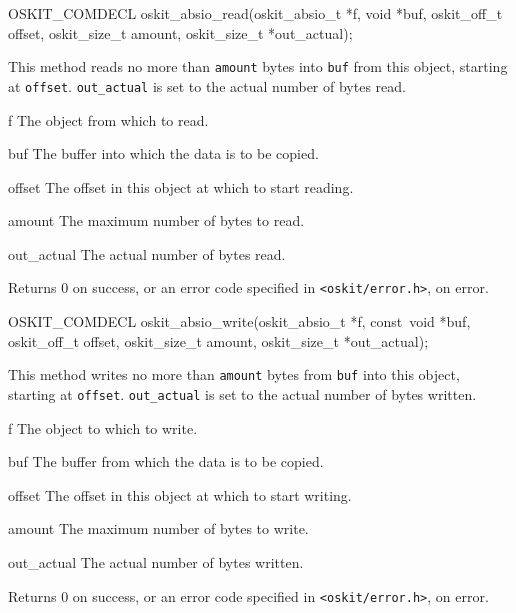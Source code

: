 \begin{apisyn}

	\funcproto OSKIT_COMDECL
	oskit_absio_read(oskit_absio_t *f, 
		         void *buf,
	                 oskit_off_t offset,
			 oskit_size_t amount,
			 \outparam oskit_size_t *out_actual);
\end{apisyn}
\begin{apidesc}
	This method reads no more than {\tt amount} bytes into
	{\tt buf} from this object, starting at {\tt offset}.
	{\tt out_actual} is set to the actual number of bytes read.
\end{apidesc}
\begin{apiparm}
	\item[f]
		The object from which to read.
	\item[buf]
		The buffer into which the data is to be copied.	
	\item[offset]
		The offset in this object at which to start reading.
	\item[amount]
		The maximum number of bytes to read.	
	\item[out_actual]
		The actual number of bytes read.
\end{apiparm}
\begin{apiret}
	Returns 0 on success, or an error code specified in
	{\tt <oskit/error.h>}, on error.
\end{apiret}


\begin{apisyn}

	\funcproto OSKIT_COMDECL
	oskit_absio_write(oskit_absio_t *f, 
		         const~void *buf,
	                 oskit_off_t offset,
			 oskit_size_t amount,
			 \outparam oskit_size_t *out_actual);
\end{apisyn}
\begin{apidesc}
	This method writes no more than {\tt amount} bytes from
	{\tt buf} into this object, starting at {\tt offset}.
	{\tt out_actual} is set to the actual number of bytes written.
\end{apidesc}
\begin{apiparm}
	\item[f]
		The object to which to write.
	\item[buf]
		The buffer from which the data is to be copied.	
	\item[offset]
		The offset in this object at which to start writing.
	\item[amount]
		The maximum number of bytes to write.	
	\item[out_actual]
		The actual number of bytes written.
\end{apiparm}
\begin{apiret}
	Returns 0 on success, or an error code specified in
	{\tt <oskit/error.h>}, on error.
\end{apiret}


